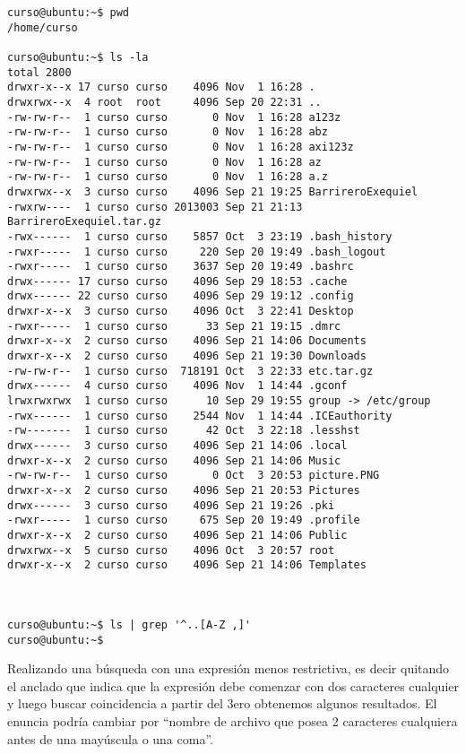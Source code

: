 \documentclass[a4paper,11pt,spanish]{article} %
\newenvironment{myscriptlisting}
{\begin{list}{}{\setlength{\leftmargin}{1em}}\item\scriptsize\bfseries}
{\end{list}}
\begin{document}
\begin{myscriptlisting}
 \begin{verbatim}
curso@ubuntu:~$ pwd
/home/curso

curso@ubuntu:~$ ls -la
total 2800
drwxr-x--x 17 curso curso    4096 Nov  1 16:28 .
drwxrwx--x  4 root  root     4096 Sep 20 22:31 ..
-rw-rw-r--  1 curso curso       0 Nov  1 16:28 a123z
-rw-rw-r--  1 curso curso       0 Nov  1 16:28 abz
-rw-rw-r--  1 curso curso       0 Nov  1 16:28 axi123z
-rw-rw-r--  1 curso curso       0 Nov  1 16:28 az
-rw-rw-r--  1 curso curso       0 Nov  1 16:28 a.z
drwxrwx--x  3 curso curso    4096 Sep 21 19:25 BarrireroExequiel
-rwxrw----  1 curso curso 2013003 Sep 21 21:13 BarrireroExequiel.tar.gz
-rwx------  1 curso curso    5857 Oct  3 23:19 .bash_history
-rwxr-----  1 curso curso     220 Sep 20 19:49 .bash_logout
-rwxr-----  1 curso curso    3637 Sep 20 19:49 .bashrc
drwx------ 17 curso curso    4096 Sep 29 18:53 .cache
drwx------ 22 curso curso    4096 Sep 29 19:12 .config
drwxr-x--x  3 curso curso    4096 Oct  3 22:41 Desktop
-rwxr-----  1 curso curso      33 Sep 21 19:15 .dmrc
drwxr-x--x  2 curso curso    4096 Sep 21 14:06 Documents
drwxr-x--x  2 curso curso    4096 Sep 21 19:30 Downloads
-rw-rw-r--  1 curso curso  718191 Oct  3 22:33 etc.tar.gz
drwx------  4 curso curso    4096 Nov  1 14:44 .gconf
lrwxrwxrwx  1 curso curso      10 Sep 29 19:55 group -> /etc/group
-rwx------  1 curso curso    2544 Nov  1 14:44 .ICEauthority
-rw-------  1 curso curso      42 Oct  3 22:18 .lesshst
drwx------  3 curso curso    4096 Sep 21 14:06 .local
drwxr-x--x  2 curso curso    4096 Sep 21 14:06 Music
-rw-rw-r--  1 curso curso       0 Oct  3 20:53 picture.PNG
drwxr-x--x  2 curso curso    4096 Sep 21 20:53 Pictures
drwx------  3 curso curso    4096 Sep 21 19:26 .pki
-rwxr-----  1 curso curso     675 Sep 20 19:49 .profile
drwxr-x--x  2 curso curso    4096 Sep 21 14:06 Public
drwxrwx--x  5 curso curso    4096 Oct  3 20:57 root
drwxr-x--x  2 curso curso    4096 Sep 21 14:06 Templates



curso@ubuntu:~$ ls | grep '^..[A-Z ,]'
curso@ubuntu:~$ 
\end{verbatim}
\end{myscriptlisting}

Realizando una búsqueda con una expresión menos restrictiva, es decir quitando el anclado que indica
que la expresión debe comenzar con dos caracteres cualquier y luego buscar coincidencia a partir
del 3ero obtenemos algunos resultados. El enuncia podría cambiar por ``nombre de archivo que posea 2
caracteres cualquiera antes de una mayúscula o una coma''.
\end{document}
